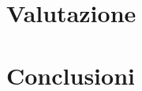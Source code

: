 \documentclass[10.5pt]{article}
\begin{document}
\section{Valutazione}


\section{Conclusioni}






\end{document}
